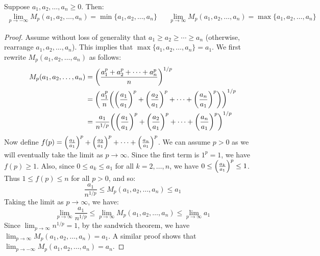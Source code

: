 \documentclass[main.tex]{subfiles}
\begin{document}
\begin{proposition}
    Suppose $a_1,a_2,\ldots,a_n\ge 0$. Then:
    \begin{align*}
        \lim_{p\to-\infty} M_p(a_1,a_2,\ldots,a_n)= \min\{a_1,a_2,\ldots,a_n\} &&
        \lim_{p\to\infty} M_p(a_1,a_2,\ldots,a_n)= \max\{a_1,a_2,\ldots,a_n\}
    \end{align*}
\end{proposition}
\begin{proof}
    Assume without loss of generality that $a_1\ge a_2\ge\cdots\ge a_n$ (otherwise, rearrange $a_1,a_2,\ldots,a_n$). This implies that $\max\{a_1,a_2,\ldots,a_n\}=a_1$. We first rewrite $M_p(a_1,a_2,\ldots,a_n)$ as follows:
    \begin{align*}
        M_p(a_1,a_2,\ldots,a_n)
        &= \qty(\frac{a_1^p+a_2^p+\cdots+a_n^p}{n})^{1/p} \\
        &= \qty(\frac{a_1^p}{n}\qty(\qty(\frac{a_1}{a_1})^p+\qty(\frac{a_2}{a_1})^p+\cdots+\qty(\frac{a_n}{a_1})^p))^{1/p} \\
        &= \frac{a_1}{n^{1/p}}\qty(\qty(\frac{a_1}{a_1})^p+\qty(\frac{a_2}{a_1})^p+\cdots+\qty(\frac{a_n}{a_1})^p)^{1/p}
    \end{align*}
    Now define $f(p)= \qty(\frac{a_1}{a_1})^p+\qty(\frac{a_2}{a_1})^p+\cdots+\qty(\frac{a_n}{a_1})^p$. We can assume $p>0$ as we will eventually take the limit as $p\to\infty$. Since the first term is $1^p=1$, we have $f(p)\ge1$. Also, since $0\le a_k\le a_1$ for all $k=2,\ldots,n$, we have $0\le\qty(\frac{a_k}{a_1})^p\le1$. Thus $1\le f(p)\le n$ for all $p>0$, and so:
    \begin{equation*}
        \frac{a_1}{n^{1/p}}\le M_p(a_1,a_2,\ldots,a_n)\le a_1
    \end{equation*}
    Taking the limit as $p\to\infty$, we have:
    \begin{equation*}
        \lim_{p\to\infty} \frac{a_1}{n^{1/p}}\le\lim_{p\to\infty} M_p(a_1,a_2,\ldots,a_n)\le\lim_{p\to\infty} a_1
    \end{equation*}
    Since $\lim_{p\to\infty} n^{1/p}=1$, by the sandwich theorem, we have $\lim_{p\to\infty} M_p(a_1,a_2,\ldots,a_n)=a_1$. A similar proof shows that $\lim_{p\to-\infty} M_p(a_1,a_2,\ldots,a_n)=a_n$.
\end{proof}
\end{document}
